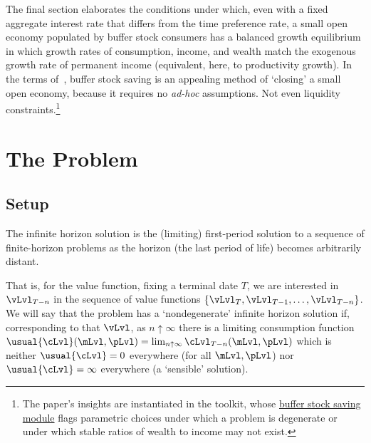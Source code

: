 \documentclass[BufferStockTheory]{subfiles}
\begin{document}
The final section elaborates the conditions under which, even with a fixed aggregate interest rate that differs from the time preference rate, a small open economy populated by buffer stock consumers has a balanced growth equilibrium in which growth rates of consumption, income, and wealth match the exogenous growth rate of permanent income (equivalent, here, to productivity growth). In the terms of~\cite{schmitt2003closing}, buffer stock saving is an appealing method of `closing' a small open economy, because it requires no \textit{ad-hoc} assumptions.  Not even liquidity constraints.\footnote{The paper's insights are instantiated in the {\ARKurl} toolkit, whose \href{https://hark.readthedocs.io/en/stable/reference/ConsumptionSaving/ConsIndShockModel.html}{buffer stock saving module} flags parametric choices under which a problem is degenerate or under which stable ratios of wealth to income may not exist.}


\hypertarget{The-Problem}{}
\section{The Problem}
\subsection{Setup}\label{subsec:Setup}

The infinite horizon solution is the (limiting) first-period solution to a sequence of finite-horizon problems as the horizon (the last period of life) becomes arbitrarily distant.

\hypertarget{sensible}{}\hypertarget{useful}{}
That is, for the value function, fixing a terminal date $T$,  we are interested in $\vLvl_{T-n}$ in the sequence of value functions $\{\vLvl_{T},\vLvl_{T-1},\ldots,\vLvl_{T-n}\}$.  We will say that the problem has a `nondegenerate' infinite horizon solution if, corresponding to that $\vLvl$, as $n \uparrow \infty$ there is a limiting consumption function $\usual{\cLvl}(\mLvl,\pLvl) = \lim_{n \uparrow \infty} \cLvl_{T-n}(\mLvl,\pLvl)$ which is neither $\usual{\cLvl}=0$ everywhere (for all $\mLvl,\pLvl$) nor $\usual{\cLvl}=\infty$ everywhere (a `sensible' solution).
\end{document}
